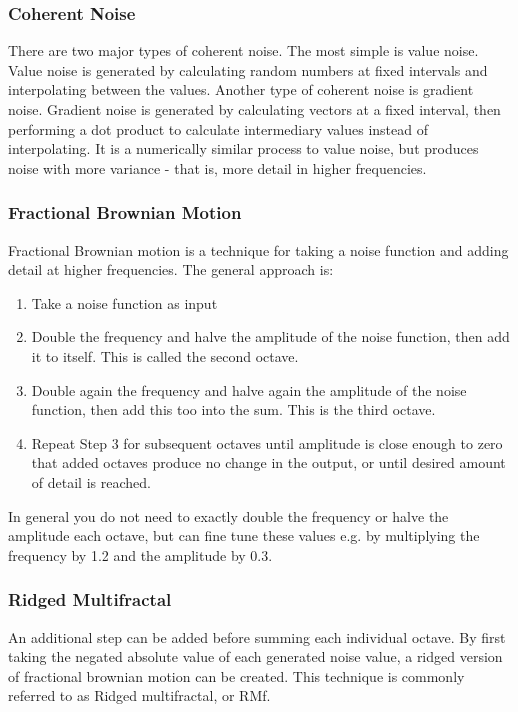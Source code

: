\subsubsection{Coherent Noise}

There are two major types of coherent noise.
The most simple is value noise.
Value noise is generated by calculating random numbers at fixed intervals and interpolating between the values.
Another type of coherent noise is gradient noise.
Gradient noise is generated by calculating vectors at a fixed interval, then performing a dot product to calculate intermediary values instead of interpolating.
It is a numerically similar process to value noise, but produces noise with more variance - that is, more detail in higher frequencies.

\subsubsection{Fractional Brownian Motion}

Fractional Brownian motion is a technique for taking a noise function and adding detail at higher frequencies.
The general approach is:
\begin{enumerate}
\item Take a noise function as input
\item Double the frequency and halve the amplitude of the noise function, then add it to itself. This is called the second octave.
\item Double again the frequency and halve again the amplitude of the noise function, then add this too into the sum. This is the third octave.
\item Repeat Step 3 for subsequent octaves until amplitude is close enough to zero that added octaves produce no change in the output, or until desired amount of detail is reached.
\end{enumerate}

In general you do not need to exactly double the frequency or halve the amplitude each octave, but can fine tune these values e.g. by multiplying the frequency by 1.2 and the amplitude by 0.3.

\subsubsection{Ridged Multifractal}

An additional step can be added before summing each individual octave.
By first taking the negated absolute value of each generated noise value, a ridged version of fractional brownian motion can be created.
This technique is commonly referred to as Ridged multifractal, or RMf.

